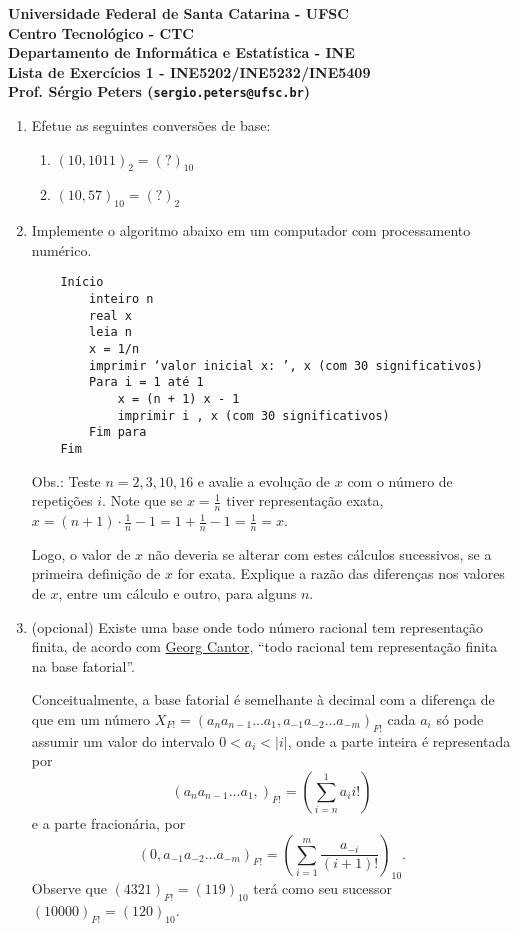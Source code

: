\documentclass[12pt]{article}
\newenvironment{smallitem}{
    \vspace{-2mm}
    \begin{enumerate}
    \setlength{\parskip}{0pt}
    \setlength{\itemsep}{2pt}
}{
    \vspace{-2mm}
    \end{enumerate}
}
\begin{document}
{\bf \noindent Universidade Federal de Santa Catarina - UFSC \\
Centro Tecnológico - CTC \\
Departamento de Informática e Estatística - INE \\

\noindent Lista de Exercícios 1 - INE5202/INE5232/INE5409 \\
Prof. Sérgio Peters (\texttt{sergio.peters@ufsc.br})}

\begin{enumerate}[label=\textbf{\arabic*})]

\item Efetue as seguintes conversões de base:

\begin{smallitem}

\item $(10,1011)_2 = (?)_{10}$
\item $(10,57)_{10} = (?)_2$

\end{smallitem}

\item Implemente o algoritmo abaixo em um computador com processamento
numérico.
\begin{verbatim}
    Início
        inteiro n
        real x
        leia n
        x = 1/n
        imprimir ‘valor inicial x: ’, x (com 30 significativos)
        Para i = 1 até 1
            x = (n + 1) x - 1
            imprimir i , x (com 30 significativos)
        Fim para
    Fim\end{verbatim}
Obs.: Teste $n = 2, 3, 10, 16$ e avalie a evolução de $x$ com o número de
repetições $i$.  Note que se $x = \frac{1}{n}$ tiver representação exata,
$x = (n + 1) \cdot \frac{1}{n} - 1 = 1 + \frac{1}{n} - 1 = \frac{1}{n} = x$.

Logo, o valor de $x$ não deveria se alterar com estes cálculos sucessivos,
se a primeira definição de $x$ for exata. Explique a razão das diferenças
nos valores de $x$, entre um cálculo e outro, para alguns $n$.

\item (opcional) Existe uma base onde todo número racional tem
representação finita, de acordo com
\href{https://en.wikipedia.org/wiki/Georg_Cantor}{Georg Cantor}, “todo
racional tem representação finita na base fatorial”.

Conceitualmente, a base fatorial é semelhante à decimal com a
diferença de que em um número $X_{F!} = (a_n a_{n-1} \dots a_1, a_{-1}
a_{-2} \dots a_{-m})_{F!}$ cada $a_i$ só pode assumir um valor do intervalo
$0 < a_i < \lvert i \rvert$, onde a parte inteira é representada por
\begin{equation*}
(a_n a_{n-1} \dots a_1,)_{F!} = \left( \sum_{i=n}^1 a_i i! \right)
\end{equation*}
e a parte fracionária, por
\begin{equation*}
(0, a_{-1} a_{-2} \dots a_{-m})_{F!} = \left( \sum_{i=1}^m
\frac{a_{-i}}{(i+1)!} \right)_{10}.
\end{equation*}
Observe que $(4321)_{F!} = (119)_{10}$ terá como seu sucessor
$(10000)_{F!} = (120)_{10}$.


\end{enumerate}
\end{document}
